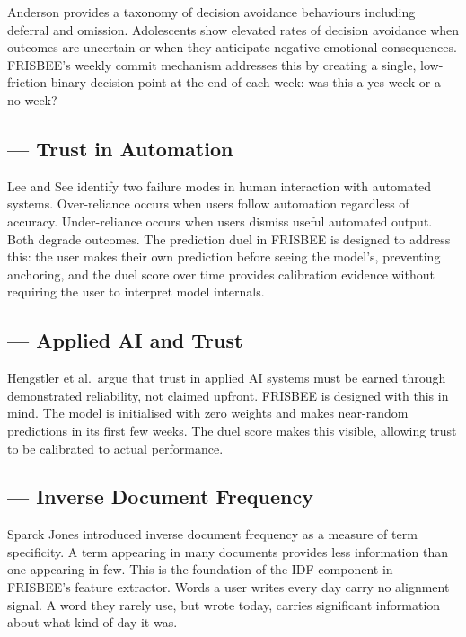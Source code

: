\documentclass[11pt, a4paper]{report}
\begin{document}
Anderson provides a taxonomy of decision avoidance behaviours including
deferral and omission. Adolescents show elevated rates of decision avoidance
when outcomes are uncertain or when they anticipate negative emotional
consequences. FRISBEE's weekly commit mechanism addresses this by creating
a single, low-friction binary decision point at the end of each week: was
this a yes-week or a no-week?

\subsection{\citet{lee2004} --- Trust in Automation}

Lee and See identify two failure modes in human interaction with automated
systems. Over-reliance occurs when users follow automation regardless of
accuracy. Under-reliance occurs when users dismiss useful automated output.
Both degrade outcomes. The prediction duel in FRISBEE is designed to
address this: the user makes their own prediction before seeing the model's,
preventing anchoring, and the duel score over time provides calibration
evidence without requiring the user to interpret model internals.

\subsection{\citet{hengstler2016} --- Applied AI and Trust}

Hengstler et al.\ argue that trust in applied AI systems must be earned
through demonstrated reliability, not claimed upfront. FRISBEE is designed
with this in mind. The model is initialised with zero weights and makes
near-random predictions in its first few weeks. The duel score makes this
visible, allowing trust to be calibrated to actual performance.

\subsection{\citet{sparckjones1972} --- Inverse Document Frequency}

Sparck Jones introduced inverse document frequency as a measure of term
specificity. A term appearing in many documents provides less information
than one appearing in few. This is the foundation of the IDF component in
FRISBEE's feature extractor. Words a user writes every day carry no
alignment signal. A word they rarely use, but wrote today, carries
significant information about what kind of day it was.
\end{document}
